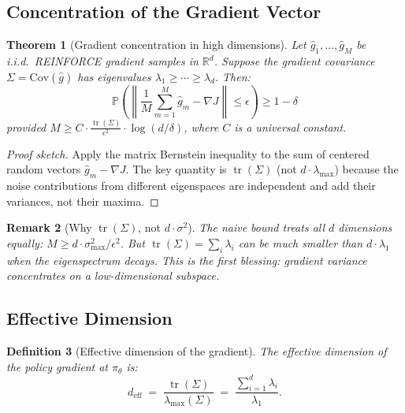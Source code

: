 \documentclass[11pt,a4paper]{article}
\newtheorem{theorem}{Theorem}[section]
\newtheorem{definition}[theorem]{Definition}
\newtheorem{remark}[theorem]{Remark}
\DeclareMathOperator{\tr}{tr}
\newcommand{\R}{\mathbb{R}}
\newcommand{\Prob}{\mathbb{P}}
\begin{document}
\subsection{Concentration of the Gradient Vector}

\begin{theorem}[Gradient concentration in high dimensions]\label{thm:concentration}
Let $\hat{g}_1, \ldots, \hat{g}_M$ be i.i.d.\ REINFORCE gradient samples
in $\R^d$. Suppose the gradient covariance $\Sigma = \text{Cov}(\hat{g})$
has eigenvalues $\lambda_1 \geq \cdots \geq \lambda_d$. Then:
\begin{equation}\label{eq:concentration}
  \Prob\!\left(\left\|\frac{1}{M}\sum_{m=1}^M \hat{g}_m - \nabla J\right\|
  \leq \epsilon\right) \geq 1 - \delta
\end{equation}
provided $M \geq C \cdot \frac{\tr(\Sigma)}{\epsilon^2} \cdot \log(d/\delta)$,
where $C$ is a universal constant.
\end{theorem}

\begin{proof}[Proof sketch]
Apply the matrix Bernstein inequality to the sum of centered random
vectors $\hat{g}_m - \nabla J$. The key quantity is $\tr(\Sigma)$
(not $d \cdot \lambda_{\max}$) because the noise contributions from
different eigenspaces are independent and add their variances, not
their maxima.
\end{proof}

\begin{remark}[Why $\tr(\Sigma)$, not $d \cdot \sigma^2$]
The naive bound treats all $d$ dimensions equally:
$M \geq d \cdot \sigma^2_{\max} / \epsilon^2$.
But $\tr(\Sigma) = \sum_i \lambda_i$ can be \emph{much} smaller than
$d \cdot \lambda_1$ when the eigenspectrum decays. This is the first
blessing: gradient variance concentrates on a low-dimensional subspace.
\end{remark}


\subsection{Effective Dimension}

\begin{definition}[Effective dimension of the gradient]\label{def:deff}
The effective dimension of the policy gradient at $\pi_\theta$ is:
\begin{equation}\label{eq:deff}
  d_{\text{eff}} \;=\; \frac{\tr(\Sigma)}{\lambda_{\max}(\Sigma)}
  \;=\; \frac{\sum_{i=1}^d \lambda_i}{\lambda_1}.
\end{equation}
\end{definition}
\end{document}
